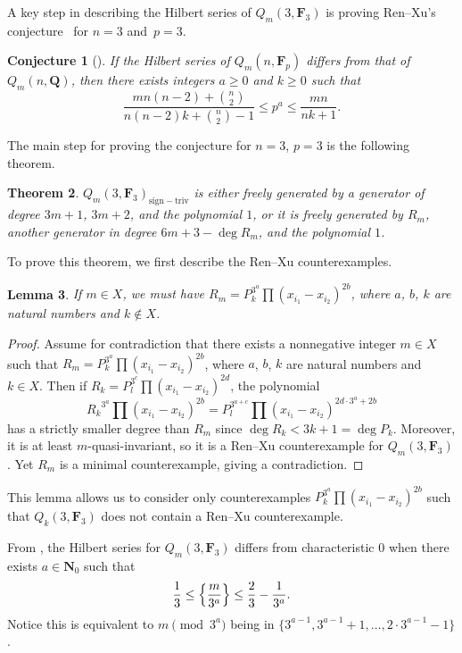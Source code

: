 \documentclass[11pt]{article}
\numberwithin{equation}{section}
\newtheorem{Theorem}{Theorem}[section]
\newtheorem{Lemma}[Theorem]{Lemma}
\newtheorem{Conjecture}[Theorem]{Conjecture}
\theoremstyle{definition}
\numberwithin{equation}{section}
\newcommand{\siv}{\mathrm{sign-triv}}
\begin{document}
A key step in describing the Hilbert series of $Q_m(3,\mathbf{F}_3)$ is proving Ren--Xu's conjecture~\cite{Ren_2020} for ${n=3}$ and~${p=3}$.

\begin{Conjecture}[\cite{Ren_2020}]\label{conj:ren}
 If the Hilbert series of $Q_m(n,\mathbf{F}_p)$ differs from that of $Q_m(n,\mathbf{Q})$, then there exists integers $a\geq 0$ and $k\geq 0$ such that
 \[\frac{mn(n-2)+\binom{n}{2}}{n(n-2)k+\binom{n}{2}-1}\leq p^a\leq \frac{mn}{nk+1}.\]
\end{Conjecture}

The main step for proving the conjecture for $n=3$, $p=3$ is the following theorem.

\begin{Theorem}\label{justRens}
 $Q_m(3,\mathbf{F}_3)_{\siv}$ is either freely generated by a generator of degree $3m+1$, $3m+2$, and the polynomial $1$, or it is freely generated by $R_m$, another generator in degree $6m+3-\deg R_m$, and the polynomial $1$.
\end{Theorem}

To prove this theorem, we first describe the Ren--Xu counterexamples.

\begin{Lemma}\label{nonExsOnly}
 If $m\in X$, we must have $R_m=P_k^{3^a}\prod (x_{i_1}-x_{i_2})^{2b}$, where $a$, $b$, $k$ are natural numbers and $k\not \in X$.
\end{Lemma}
\begin{proof}
 Assume for contradiction that there exists a nonnegative integer $m\in X$ such that $R_m=P_k^{3^a}\prod (x_{i_1}-x_{i_2})^{2b}$, where $a$, $b$, $k$ are natural numbers and $k\in X$. Then if $R_k=P_{l}^{3^c}\prod (x_{i_1}-x_{i_2})^{2d}$, the polynomial
 \[{R_k}^{3^a}\prod (x_{i_1}-x_{i_2})^{2b} = P_{l}^{3^{a+c}}\prod (x_{i_1}-x_{i_2})^{2d\cdot 3^a + 2b}\]
 has a strictly smaller degree than $R_m$ since $\deg R_k<3k+1=\deg P_k$. Moreover, it is at least $m$-quasi-invariant, so it is a Ren--Xu counterexample for $Q_m(3,\mathbf{F}_3)$. Yet $R_m$ is a minimal counterexample, giving a contradiction.
\end{proof}

This lemma allows us to consider only counterexamples $P_k^{3^a}\prod (x_{i_1}-x_{i_2})^{2b}$ such that $Q_k(3,\mathbf{F}_3)$ does not contain a Ren--Xu counterexample.

From \cite{Ren_2020}, the Hilbert series for $Q_m(3,\mathbf{F}_3)$ differs from characteristic $0$ when there exists $a\in \mathbf{N}_0$ such that
\[\frac{1}{3}\leq \Bigl\{\frac{m}{3^a}\Bigr\}\leq \frac{2}{3}-\frac{1}{3^a}.\]
Notice this is equivalent to $m \pmod{3^a}$ being in $\bigl\{3^{a-1},3^{a-1}+1,\dots,2\cdot 3^{a-1}-1\bigr\}$.
\end{document}
